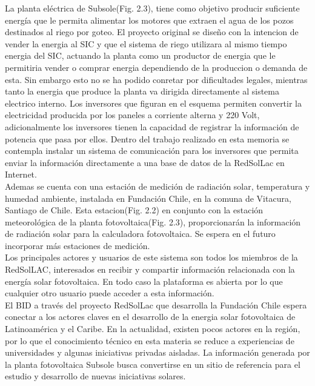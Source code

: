 La planta eléctrica de Subsole(Fig. 2.3), tiene como objetivo producir suficiente energía que le permita alimentar los motores que extraen el agua de los pozos destinados al riego por goteo. El proyecto original se diseño con la intencion de vender la energia al SIC y que el sistema de riego utilizara al mismo tiempo energia del SIC, actuando la planta como un productor de energia que le permitiria vender o comprar energia dependiendo de la produccion o demanda de esta. Sin embargo esto no se ha podido conretar por dificultades legales, mientras tanto la energia que produce la planta va dirigida directamente al sistema electrico interno.
Los inversores que figuran en el esquema permiten convertir la electricidad producida por los paneles a corriente alterna y 220 Volt, adicionalmente los inversores tienen la capacidad de registrar la información de potencia que pasa por ellos. Dentro del trabajo realizado en esta memoria se contempla instalar un sistema de comunicación para los inversores que permita enviar la información directamente a una base de datos de la RedSolLac en Internet.\\

Ademas se cuenta con una estación de medición de radiación solar, temperatura y humedad ambiente, instalada en Fundación Chile, en la comuna de Vitacura, Santiago de Chile. Esta estacion(Fig. 2.2) en conjunto con la estación meteorológica de la planta fotovoltaica(Fig. 2.3), proporcionarán la información de radiación solar para la calculadora fotovoltaica. Se espera en el futuro incorporar más estaciones de medición.\\

Los principales actores y usuarios de este sistema son todos los miembros de la RedSolLAC, interesados en recibir y compartir información relacionada con la energía solar fotovoltaica. En todo caso la plataforma es abierta por lo que cualquier otro usuario puede acceder a esta información.\\

El BID a través del proyecto RedSolLac que desarrolla la Fundación Chile espera conectar a los actores claves en el desarrollo de la energia solar fotovoltaica de Latinoamérica y el Caribe. En la actualidad, existen pocos actores en la región, por lo que el conocimiento técnico en esta materia se reduce a experiencias de universidades y algunas iniciativas privadas aisladas. La información generada por la planta fotovoltaica Subsole busca convertirse en un sitio de referencia para el estudio y desarrollo de nuevas iniciativas solares.\\

